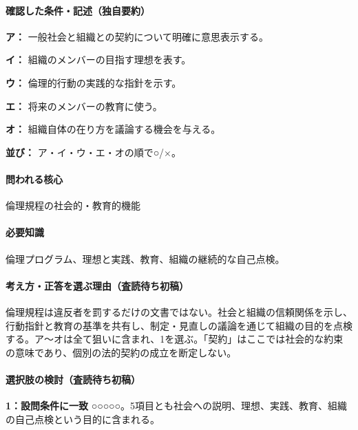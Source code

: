 \paragraph{確認した条件・記述（独自要約）}\mbox{}\par

\noindent\textbf{ア：} 一般社会と組織との契約について明確に意思表示する。\par

\noindent\textbf{イ：} 組織のメンバーの目指す理想を表す。\par

\noindent\textbf{ウ：} 倫理的行動の実践的な指針を示す。\par

\noindent\textbf{エ：} 将来のメンバーの教育に使う。\par

\noindent\textbf{オ：} 組織自体の在り方を議論する機会を与える。\par

\noindent\textbf{並び：} ア・イ・ウ・エ・オの順で○/×。\par

\paragraph{問われる核心} 倫理規程の社会的・教育的機能

\paragraph{必要知識} 倫理プログラム、理想と実践、教育、組織の継続的な自己点検。

\paragraph{考え方・正答を選ぶ理由（査読待ち初稿）} 倫理規程は違反者を罰するだけの文書ではない。社会と組織の信頼関係を示し、行動指針と教育の基準を共有し、制定・見直しの議論を通じて組織の目的を点検する。ア〜オは全て狙いに含まれ、1を選ぶ。「契約」はここでは社会的な約束の意味であり、個別の法的契約の成立を断定しない。

\paragraph{選択肢の検討（査読待ち初稿）}\mbox{}\par

\noindent\textbf{1：設問条件に一致} ○○○○○。5項目とも社会への説明、理想、実践、教育、組織の自己点検という目的に含まれる。\par

